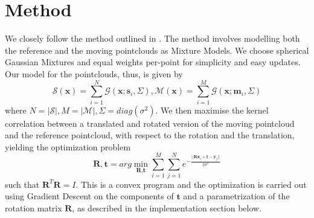 \documentclass[11pt, a4paper]{article}
\begin{document}
\section{Method}
We closely follow the method outlined in \cite{main}. The method involves modelling both the reference and the moving pointclouds as Mixture Models. We choose spherical Gaussian Mixtures and equal weights per-point for simplicity and easy updates. Our model for the pointclouds, thus, is given by $$\mathcal{S}(\textbf{x}) = \sum_{i=1}^N \mathcal{G}(\textbf{x}; \textbf{s}_i, \Sigma), \mathcal{M}(\textbf{x}) = \sum_{i=1}^M \mathcal{G}(\textbf{x}; \textbf{m}_i, \Sigma)$$ where $N = |\mathcal{S}|, M = |\mathcal{M}|, \Sigma = diag(\sigma^2)$. We then maximise the kernel correlation between a translated and rotated version of the moving pointcloud and the reference pointcloud, with respect to the rotation and the translation, yielding the optimization problem $$\textbf{R}, \textbf{t} = arg\min_{\textbf{R}, \textbf{t}} \sum_{i=1}^M \sum_{j=1}^N e^{-\frac{|| \textbf{Rx}_i + \textbf{t} - \textbf{y}_j ||}{2 \sigma^2}}$$ such that $\textbf{R}^T \textbf{R} = I$. This is a convex program and the optimization is carried out using Gradient Descent on the components of $\textbf{t}$ and a parametrization of the rotation matrix $\textbf{R}$, as described in the implementation section below.
\end{document}
